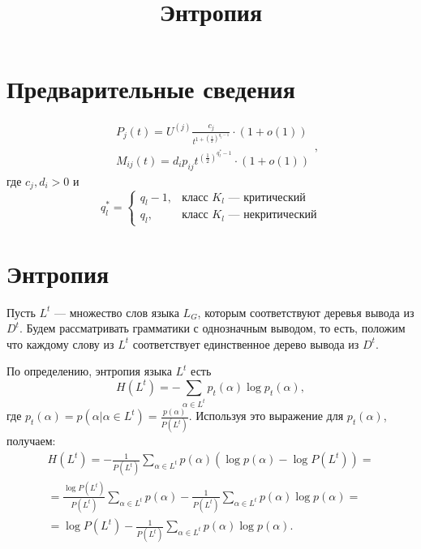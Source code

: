 \documentclass[12pt]{article}
\title{Энтропия}
\begin{document}
\setlength{\parindent}{0pt}
\setlength{\parskip}{8pt}

\section{Предварительные сведения}

\begin{equation}
\begin{split}
	&P_j(t) = U^{(j)} \frac{c_j}{t^{1+\left(\frac{1}{2}\right)^{q_j-1}}} \cdot (1 + o(1)) \\
	&M_{ij}(t) = d_i p_{ij} t^{\left(\frac{1}{2}\right)^{q^*_l-1}} \cdot (1 + o(1))
\end{split},
\end{equation}
где $c_j, d_i > 0$ и
\begin{equation}
	q^*_l =
	\begin{cases}
		q_l - 1, &\text{класс } K_l \text{ --- критический} \\
		q_l, &\text{класс } K_l \text{ --- некритический}
	\end{cases}
\end{equation}

\section{Энтропия}

Пусть $L^t$ --- множество слов языка $L_G$, которым соответствуют деревья вывода из $D^t$. Будем рассматривать грамматики с однозначным выводом, то есть, положим что каждому слову из $L^t$ соответствует единственное дерево вывода из $D^t$.

По определению, энтропия языка $L^t$ есть
\begin{equation}
	H(L^t) = -\sum_{\alpha \in L^t} p_t(\alpha) \log p_t(\alpha),
\end{equation}
где $p_t(\alpha) = p(\alpha | \alpha \in L^t) = \frac{p(\alpha)}{P(L^t)}$. Используя это выражение для $p_t(\alpha)$, получаем:
\begin{multline}
\label{eq:entropy_1}
	H(L^t) = - \frac{1}{P(L^t)} \sum_{\alpha \in L^t} p(\alpha) \left( \log p(\alpha) - \log P(L^t) \right) = \\
	= \frac{\log P(L^t)}{P(L^t)} \sum_{\alpha \in L^t} p(\alpha) - \frac{1}{P(L^t)} \sum_{\alpha \in L^t} p(\alpha) \log p(\alpha) = \\
	= \log P(L^t) - \frac{1}{P(L^t)} \sum_{\alpha \in L^t} p(\alpha) \log p(\alpha).
\end{multline}
\end{document}
